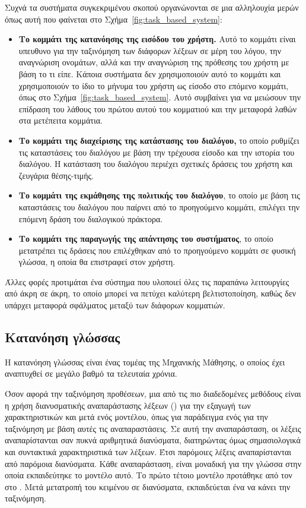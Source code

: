 Συχνά τα συστήματα συγκεκριμένου σκοπού οργανώνονται σε μια αλληλουχία μερών όπως αυτή που φαίνεται στο Σχήμα~\ref{fig:task_based_system}:
\begin{itemize}
    \item \textbf{Το κομμάτι της κατανόησης της εισόδου του χρήστη.} Αυτό το κομμάτι είναι υπευθυνο για την ταξινόμηση των διάφορων λέξεων σε μέρη του λόγου, την αναγνώριση ονομάτων, αλλά και την αναγνώριση της πρόθεσης του χρήστη με βάση το τι είπε. Κάποια συστήματα δεν χρησιμοποιούν αυτό το κομμάτι και χρησιμοποιούν το ίδιο το μήνυμα του χρήστη ως είσοδο στο επόμενο κομμάτι, όπως στο Σχήμα~\ref{fig:task_based_system}. Αυτό συμβαίνει για να μειώσουν την επίδραση του λάθους του πρώτου αυτού του κομματιού και την μεταφορά λαθών στα μετέπειτα κομμάτια.
    \item \textbf{Το κομμάτι της διαχείρισης της κατάστασης του διαλόγου,} το οποίο ρυθμίζει τις καταστάσεις του διαλόγου με βάση την τρέχουσα είσοδο και την ιστορία του διαλόγου. Η κατάσταση του διαλόγου περιέχει σχετικές δράσεις του χρήστη και ζευγάρια θέσης-τιμής.
    \item \textbf{Το κομμάτι της εκμάθησης της πολιτικής του διαλόγου}, το οποίο με βάση τις καταστάσεις του διαλόγου που παίρνει από το προηγούμενο κομμάτι, επιλέγει την επόμενη δράση του διαλογικού πράκτορα.
    \item \textbf{Το κομμάτι της παραγωγής της απάντησης του συστήματος}, το οποίο μετατρέπει τις δράσεις που επιλέχθηκαν από το προηγούμενο κομμάτι σε φυσική γλώσσα, η οποία θα επιστραφεί στον χρήστη.
\end{itemize}

Άλλες φορές προτιμάται ένα σύστημα που υλοποιεί όλες τις παραπάνω λειτουργίες από άκρη σε άκρη, το οποίο μπορεί να πετύχει καλύτερη βελτιστοποίηση, καθώς δεν υπάρχει μεταφορά σφάλματος μεταξύ των διάφορων κομματιών.


\subsection{Κατανόηση γλώσσας}

Η κατανόηση γλώσσας είναι ένας τομέας της Μηχανικής Μάθησης, ο οποίος έχει αναπτυχθεί σε μεγάλο βαθμό τα τελευταία χρόνια.

Όσον αφορά την ταξινόμηση προθέσεων, μια από τις πιο διαδεδομένες μεθόδους είναι η χρήση διανυσματικής αναπαράστασης λέξεων () για την εξαγωγή των χαρακτηριστικών και μετά ενός μοντέλου, όπως για παράδειγμα ενός  για την ταξινόμηση με βάση αυτές τις αναπαραστάσεις. Σε αυτή την αναπαράσταση, οι λέξεις αναπαρίστανται σαν πυκνά αριθμητικά διανύσματα, διατηρώντας όμως σημασιολογικά και συντακτικά χαρακτηριστικά των λέξεων. Έτσι παρόμοιες λέξεις αναπαρίστανται από παρόμοια διανύσματα. Κάθε αναπαράσταση, είναι μοναδική για την γλώσσα στην οποία εκπαιδεύτηκε το μοντέλο αυτό. Το πρώτο τέτοιο μοντέλο προτάθηκε από τον  στο \cite{mikolov2013efficient}. Μετά μετατροπή του κειμένου σε διανύσματα, εκπαιδεύεται ένα  να κάνει την ταξινόμηση.


